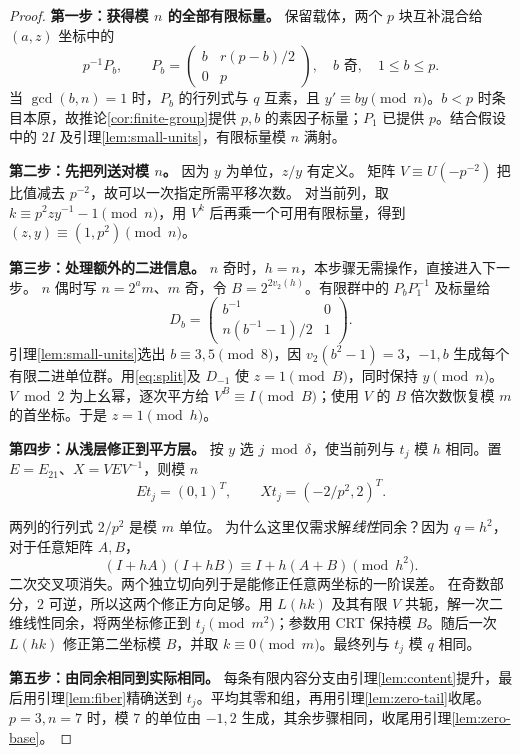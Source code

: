 \begin{proof}

\par\noindent\textbf{第一步：获得模 $n$ 的全部有限标量。}
保留载体，两个 $p$ 块互补混合给 $(a,z)$ 坐标中的
\[
p^{-1}P_b,\qquad P_b=\begin{pmatrix}b&r(p-b)/2\\0&p\end{pmatrix},
\quad b\text{ 奇},\quad1\le b\le p.
\]
当 $\gcd(b,n)=1$ 时，$P_b$ 的行列式与 $q$ 互素，且 $y'\equiv by\pmod n$。$b<p$ 时条目本原，故推论\ref{cor:finite-group}提供 $p,b$ 的素因子标量；$P_1$ 已提供 $p$。结合假设中的 $2I$ 及引理\ref{lem:small-units}，有限标量模 $n$ 满射。

\par\noindent\textbf{第二步：先把列送对模 $n$。}
因为 $y$ 为单位，$z/y$ 有定义。
矩阵 $V\equiv U(-p^{-2})$ 把比值减去 $p^{-2}$，故可以一次指定所需平移次数。
对当前列，取 $k\equiv p^2zy^{-1}-1\pmod n$，用 $V^k$ 后再乘一个可用有限标量，得到 $(z,y)\equiv(1,p^2)\pmod n$。


\par\noindent\textbf{第三步：处理额外的二进信息。}
$n$ 奇时，$h=n$，本步骤无需操作，直接进入下一步。
$n$ 偶时写 $n=2^a m$、$m$ 奇，令 $B=2^{2v_2(h)}$。有限群中的 $P_bP_1^{-1}$ 及标量给
\begin{equation}\label{eq:split}
D_b=\begin{pmatrix}b^{-1}&0\\n(b^{-1}-1)/2&1\end{pmatrix}.
\end{equation}
引理\ref{lem:small-units}选出 $b\equiv3,5\pmod8$，因 $v_2(b^2-1)=3$，$-1,b$ 生成每个有限二进单位群。用\eqref{eq:split}及 $D_{-1}$ 使 $z=1\pmod B$，同时保持 $y\pmod n$。$V\bmod2$ 为上幺幂，逐次平方给 $V^B\equiv I\pmod B$；使用 $V$ 的 $B$ 倍次数恢复模 $m$ 的首坐标。于是 $z=1\pmod h$。

\par\noindent\textbf{第四步：从浅层修正到平方层。}
按 $y$ 选 $j\bmod\delta$，使当前列与 $t_j$ 模 $h$ 相同。置 $E=E_{21}$、$X=VEV^{-1}$，则模 $n$
\[
Et_j=(0,1)^T,\qquad Xt_j=(-2/p^2,2)^T.
\]

两列的行列式 $2/p^2$ 是模 $m$ 单位。
为什么这里仅需求解\emph{线性}同余？因为 $q=h^2$，对于任意矩阵 $A,B$，
\[
(I+hA)(I+hB)\equiv I+h(A+B)\pmod{h^2}.
\]
二次交叉项消失。两个独立切向列于是能修正任意两坐标的一阶误差。
在奇数部分，$2$ 可逆，所以这两个修正方向足够。用 $L(hk)$ 及其有限 $V$ 共轭，解一次二维线性同余，将两坐标修正到 $t_j\pmod{m^2}$；参数用 CRT 保持模 $B$。随后一次 $L(hk)$ 修正第二坐标模 $B$，并取 $k\equiv0\pmod m$。最终列与 $t_j$ 模 $q$ 相同。

\par\noindent\textbf{第五步：由同余相同到实际相同。}
每条有限内容分支由引理\ref{lem:content}提升，最后用引理\ref{lem:fiber}精确送到 $t_j$。平均其零和组，再用引理\ref{lem:zero-tail}收尾。$p=3,n=7$ 时，模 $7$ 的单位由 $-1,2$ 生成，其余步骤相同，收尾用引理\ref{lem:zero-base}。
\end{proof}

